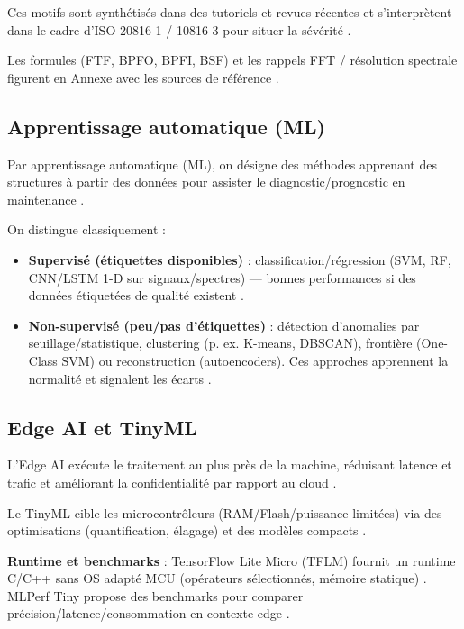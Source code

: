 Ces motifs sont synthétisés dans des tutoriels et revues récentes \cite{tiboni2022,matania2024} et s'interprètent dans le cadre d'ISO 20816-1 / 10816-3 pour situer la sévérité \cite{iso20816-1,iso20816-3}.

Les formules (FTF, BPFO, BPFI, BSF) et les rappels FFT / résolution spectrale figurent en Annexe avec les sources de référence \cite{bkvibro2002,randall2011,oppenheim2010,cooley1965}.

\subsection{Apprentissage automatique (ML)}

Par apprentissage automatique (ML), on désigne des méthodes apprenant des structures à partir des données pour assister le diagnostic/prognostic en maintenance \cite{jardine2006,lee2014}.

On distingue classiquement :

\begin{itemize}
\item \textbf{Supervisé (étiquettes disponibles)} : classification/régression (SVM, RF, CNN/LSTM 1-D sur signaux/spectres) — bonnes performances si des données étiquetées de qualité existent \cite{lee2014,achouch2022}.

\item \textbf{Non-supervisé (peu/pas d'étiquettes)} : détection d'anomalies par seuillage/statistique, clustering (p. ex. K-means, DBSCAN), frontière (One-Class SVM) ou reconstruction (autoencoders). Ces approches apprennent la normalité et signalent les écarts \cite{chandola2009,hector2024,achouch2022,macqueen1967}.
\end{itemize}

\subsection{Edge AI et TinyML}

L'Edge AI exécute le traitement au plus près de la machine, réduisant latence et trafic et améliorant la confidentialité par rapport au cloud \cite{shi2016,kong2022}.

Le TinyML cible les microcontrôleurs (RAM/Flash/puissance limitées) via des optimisations (quantification, élagage) et des modèles compacts \cite{warden2019,reddi2022,tsoukas2024}.

\textbf{Runtime et benchmarks} : TensorFlow Lite Micro (TFLM) fournit un runtime C/C++ sans OS adapté MCU (opérateurs sélectionnés, mémoire statique) \cite{david2021}. MLPerf Tiny propose des benchmarks pour comparer précision/latence/consommation en contexte edge \cite{banbury2021}.
